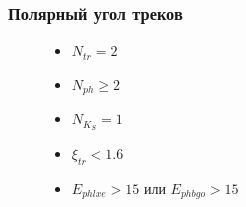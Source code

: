 \documentclass[14pt, hyperref = {colorlinks}]{beamer}
\begin{document}
\begin{frame}
\frametitle{Полярный угол треков}
\begin{figure}[h]
\begin{minipage}[h]{0.69\linewidth}   
\end{minipage}
\begin{minipage}[h]{0.29\linewidth}
    \begin{itemize}
        \item {$N_{tr} = 2$}
        \item {$N_{ph} \geq 2$}
        \item {$N_{K_{S}} = 1$}
        \item {$\xi_{tr} < 1.6$}
        \item {$E_{phlxe} > 15$ или $E_{phbgo} > 15$}
    \end{itemize}
\end{minipage}
\hfill
\end{figure}
\end{frame}
\end{document}
